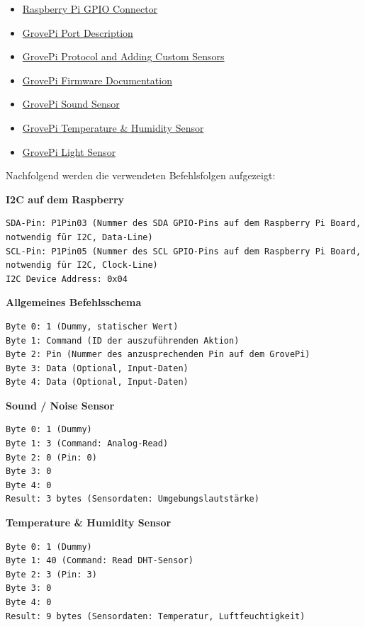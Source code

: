 \begin{itemize}
\item \hyperlink{https://learn.adafruit.com/adafruits-raspberry-pi-lesson-4-gpio-setup/the-gpio-connector}{Raspberry Pi GPIO Connector}
\item \hyperlink{http://www.dexterindustries.com/GrovePi/engineering/port-description/}{GrovePi Port Description}
\item \hyperlink{http://www.dexterindustries.com/GrovePi/programming/grovepi-protocol-adding-custom-sensors/}{GrovePi Protocol and Adding Custom Sensors}
\item \hyperlink{https://github.com/DexterInd/GrovePi/blob/bfcaa57bb6ce2b5c4cb0057569ea38f3574f24cf/Firmware/Source/v1.2/grove_pi_v1_2_6/README.md}{GrovePi Firmware Documentation}
\item \hyperlink{http://www.seeedstudio.com/wiki/Grove_-_Sound_Sensor}{GrovePi Sound Sensor}
\item \hyperlink{http://www.seeedstudio.com/wiki/Grove_-_Temperature_and_Humidity_Sensor}{GrovePi Temperature \& Humidity Sensor}
\item \hyperlink{http://www.seeedstudio.com/wiki/Grove_-_Light_Sensor}{GrovePi Light Sensor}
\end{itemize}


Nachfolgend werden die verwendeten Befehlsfolgen aufgezeigt:

\textbf{I2C auf dem Raspberry}
\begin{lstlisting}
SDA-Pin: P1Pin03 (Nummer des SDA GPIO-Pins auf dem Raspberry Pi Board, notwendig für I2C, Data-Line)
SCL-Pin: P1Pin05 (Nummer des SCL GPIO-Pins auf dem Raspberry Pi Board, notwendig für I2C, Clock-Line)
I2C Device Address: 0x04
\end{lstlisting}

\textbf{Allgemeines Befehlsschema}
\begin{lstlisting}
Byte 0: 1 (Dummy, statischer Wert)
Byte 1: Command (ID der auszuführenden Aktion)
Byte 2: Pin (Nummer des anzusprechenden Pin auf dem GrovePi)
Byte 3: Data (Optional, Input-Daten)
Byte 4: Data (Optional, Input-Daten)
\end{lstlisting}

\textbf{Sound / Noise Sensor}
\begin{lstlisting}
Byte 0: 1 (Dummy)
Byte 1: 3 (Command: Analog-Read)
Byte 2: 0 (Pin: 0)
Byte 3: 0
Byte 4: 0
Result: 3 bytes (Sensordaten: Umgebungslautstärke)
\end{lstlisting}

\textbf{Temperature \& Humidity Sensor}
\begin{lstlisting}
Byte 0: 1 (Dummy)
Byte 1: 40 (Command: Read DHT-Sensor)
Byte 2: 3 (Pin: 3)
Byte 3: 0
Byte 4: 0
Result: 9 bytes (Sensordaten: Temperatur, Luftfeuchtigkeit)
\end{lstlisting}

